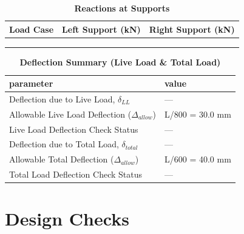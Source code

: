 \documentclass[12pt,a4paper]{report}
\numberwithin{table}{chapter}
\numberwithin{figure}{chapter}
\begin{document}
\vspace{1em}
\begin{longtable}{|>{\centering\arraybackslash}p{5.2cm}|>{\centering\arraybackslash}p{5.2cm}|>{\centering\arraybackslash}p{5.2cm}|}
\caption{\textbf{Reactions at Supports}}\\
\hline
\textbf{Load Case} & \textbf{Left Support (kN)} & \textbf{Right Support (kN)} \\[6pt]
\hline
 &  &  \\[6pt]
\hline
 &  &  \\[6pt]
\hline
 &  &  \\[6pt]
\hline
\end{longtable}

\vspace{1em}
\begin{longtable}{|L{7cm}|p{8.5cm}|}
\caption{\textbf{Deflection Summary (Live Load \& Total Load)}}\\
\hline
\textbf{parameter} & \textbf{value} \\
\hline
\textnormal{Deflection due to Live Load, $\delta_{LL}$} & --- \\[6pt]
\hline
\textnormal{Allowable Live Load Deflection ($\Delta_{allow}$)} & L/800 = 30.0 mm \\[6pt]
\hline
\textnormal{Live Load Deflection Check Status} & --- \\[6pt]
\hline
\textnormal{Deflection due to Total Load, $\delta_{total}$} & --- \\[6pt]
\hline
\textnormal{Allowable Total Deflection ($\Delta_{allow}$)} & L/600 = 40.0 mm \\[6pt]
\hline
\textnormal{Total Load Deflection Check Status} & --- \\[6pt]
\hline
\end{longtable}

\vspace{1em}
\noindent
\noindent{}
\noindent{}
\noindent{}


\chapter{Design Checks}
\end{document}
